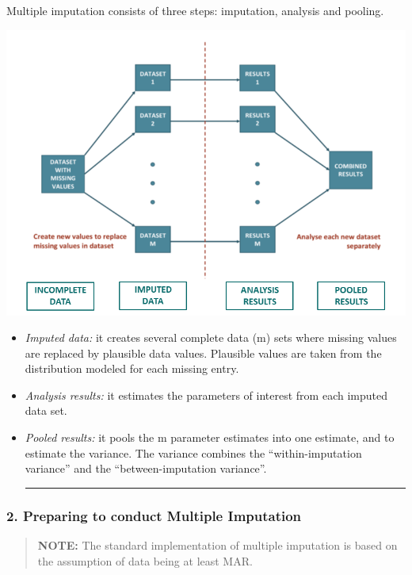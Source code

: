 \documentclass[
]{article}
\begin{document}
Multiple imputation consists of three steps: imputation, analysis and
pooling.

\includegraphics{images/Multiple imputation steps.png}

\begin{itemize}
\item
  \emph{Imputed data:} it creates several complete data (m) sets where
  missing values are replaced by plausible data values. Plausible values
  are taken from the distribution modeled for each missing entry.
\item
  \emph{Analysis results:} it estimates the parameters of interest from
  each imputed data set.
\item
  \emph{Pooled results:} it pools the m parameter estimates into one
  estimate, and to estimate the variance. The variance combines the
  ``within-imputation variance'' and the ``between-imputation
  variance''.

  \begin{center}\rule{0.5\linewidth}{0.5pt}\end{center}
\end{itemize}

\hypertarget{preparing-to-conduct-multiple-imputation}{%
\subsubsection{2. Preparing to conduct Multiple
Imputation}\label{preparing-to-conduct-multiple-imputation}}

\begin{quote}
\textbf{NOTE:} The standard implementation of multiple imputation is
based on the assumption of data being at least MAR.
\end{quote}
\end{document}
